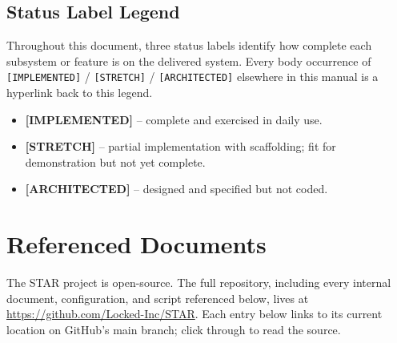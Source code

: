 \documentclass[11pt,letterpaper]{article}
\begin{document}
\subsection{Status Label Legend}
\label{sec:status-legend}
Throughout this document, three status labels identify how complete
each subsystem or feature is on the delivered system. Every body
occurrence of \texttt{[IMPLEMENTED]} / \texttt{[STRETCH]} /
\texttt{[ARCHITECTED]} elsewhere in this manual is a hyperlink back
to this legend.
\begin{itemize}[leftmargin=1.4em,itemsep=2pt]
\item \textbf{[IMPLEMENTED]} -- complete and exercised in daily use.
\item \textbf{[STRETCH]} -- partial implementation with scaffolding;
      fit for demonstration but not yet complete.
\item \textbf{[ARCHITECTED]} -- designed and specified but not coded.
\end{itemize}

\section{Referenced Documents}
\label{sec:refs}

The STAR project is open-source. The full repository, including
every internal document, configuration, and script referenced
below, lives at
\url{https://github.com/Locked-Inc/STAR}. Each entry below links to
its current location on GitHub's main branch; click through to read
the source.
\end{document}
